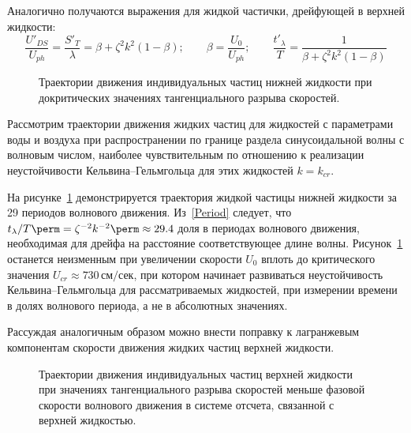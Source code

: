 Аналогично получаются выражения для жидкой частички, дрейфующей в верхней жидкости:
\begin{equation}
\dfrac{U'_{DS}}{U_{ph}}=\dfrac{S'_{T}}{\lambda}=\beta+\zeta^{2} k^{2}\left(1-\beta \right);  \qquad \beta=\dfrac{U_{0}}{U_{ph}}; \qquad  \dfrac{t'_{\lambda}}{T}=\dfrac{1}{\beta+\zeta^{2} k^{2}\left(1-\beta \right)}
\label{Period'}
\end{equation}

\begin{figure}[ht]
	\caption{Траектории движения индивидуальных частиц нижней жидкости при докритических значениях тангенциального разрыва скоростей.}
	\label{ris:Fig1}
\end{figure}
Рассмотрим траектории движения жидких частиц для жидкостей с параметрами воды и воздуха при распространении по границе раздела синусоидальной волны с волновым числом, наиболее чувствительным по отношению к реализации неустойчивости Кельвина--Гельмгольца для этих жидкостей $ k=k_{cr} $.

На рисунке~\ref{ris:Fig1} демонстрируется траектория жидкой частицы нижней жидкости за 29 периодов волнового движения. Из~\eqref{Period} следует, что $ t_{\lambda}/T\perm=\zeta^{-2}k^{-2}\perm\approx 29.4 $ доля в периодах волнового движения, необходимая для дрейфа на расстояние соответствующее длине волны. Рисунок~\ref{ris:Fig1} останется неизменным при увеличении скорости $ U_{0} $  вплоть до критического значения  $ U_{cr}\approx 730\, \text{см/сек} $, при котором начинает развиваться неустойчивость Кельвина--Гельмгольца для рассматриваемых жидкостей, при измерении времени в долях волнового периода, а не в абсолютных значениях.

Рассуждая аналогичным образом можно внести поправку к лагранжевым компонентам скорости движения жидких частиц верхней жидкости. 

\begin{figure}[ht]
	\caption{Траектории движения индивидуальных частиц верхней жидкости при значениях тангенциального разрыва скоростей меньше фазовой скорости волнового движения в системе отсчета, связанной с верхней жидкостью.}
	\label{ris:Fig2}
\end{figure}

